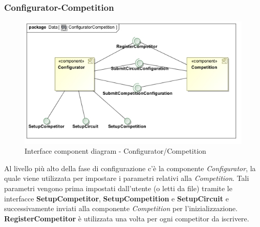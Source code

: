 \subsubsection{Configurator-Competition}
\begin{center}
\begin{figure}[h!]
	\includegraphics[scale=0.55]{img/InteractionDiagram/Implementation_Diagram__ConfiguratorCompetition.jpg}
\caption{Interface component diagram - Configurator/Competition}
\end{figure}
\end{center}
Al livello pi\`{u} alto della fase di configurazione c'\`{e} la componente \emph{Configurator}, la quale viene utilizzata per impostare i parametri
relativi alla \emph{Competition}. Tali parametri vengono prima impostati dall'utente (o letti da file) tramite le interfacce \textbf{SetupCompetitor},
\textbf{SetupCompetition} e \textbf{SetupCircuit} e successivamente inviati alla componente \emph{Competition} per l'inizializzazione.\\
\textbf{RegisterCompetitor} \`{e} utilizzata una volta per ogni competitor da iscrivere.
